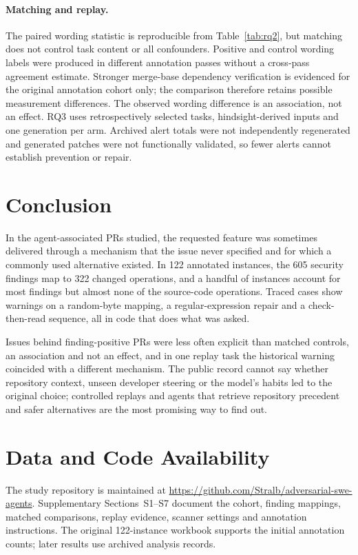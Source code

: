 \documentclass[acmsmall,screen,nonacm]{acmart}
\begin{document}
\paragraph{Matching and replay.} The paired wording statistic is reproducible from Table~\ref{tab:rq2}, but matching does not control task content or all confounders. Positive and control wording labels were produced in different annotation passes without a cross-pass agreement estimate. Stronger merge-base dependency verification is evidenced for the original annotation cohort only; the comparison therefore retains possible measurement differences. The observed wording difference is an association, not an effect. RQ3 uses retrospectively selected tasks, hindsight-derived inputs and one generation per arm. Archived alert totals were not independently regenerated and generated patches were not functionally validated, so fewer alerts cannot establish prevention or repair.

\section{Conclusion}

In the agent-associated PRs studied, the requested feature was sometimes delivered through a mechanism that the issue never specified and for which a commonly used alternative existed. In 122 annotated instances, the 605 security findings map to 322 changed operations, and a handful of instances account for most findings but almost none of the source-code operations. Traced cases show warnings on a random-byte mapping, a regular-expression repair and a check-then-read sequence, all in code that does what was asked.

Issues behind finding-positive PRs were less often explicit than matched controls, an association and not an effect, and in one replay task the historical warning coincided with a different mechanism. The public record cannot say whether repository context, unseen developer steering or the model's habits led to the original choice; controlled replays and agents that retrieve repository precedent and safer alternatives are the most promising way to find out.

\section*{Data and Code Availability}

The study repository is maintained at \url{https://github.com/Stralb/adversarial-swe-agents}. Supplementary Sections~S1--S7 document the cohort, finding mappings, matched comparisons, replay evidence, scanner settings and annotation instructions. The original 122-instance workbook supports the initial annotation counts; later results use archived analysis records.
\end{document}
